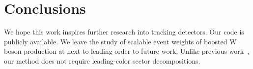 \section{Conclusions}\label{sec:conclusions}

We hope this work inspires further research into tracking detectors. Our
code is publicly available. We leave the study of scalable event weights
of boosted W boson production at next-to-leading order to future work.
Unlike previous
work~\cite{TPC:0882-W-Tagging-with-Logarithmically-Enhanced-Monte-Carlo-Event-Generators-at-the-High-Luminosity-LHC-September-18-2026},
our method does not require leading-color sector decompositions.

